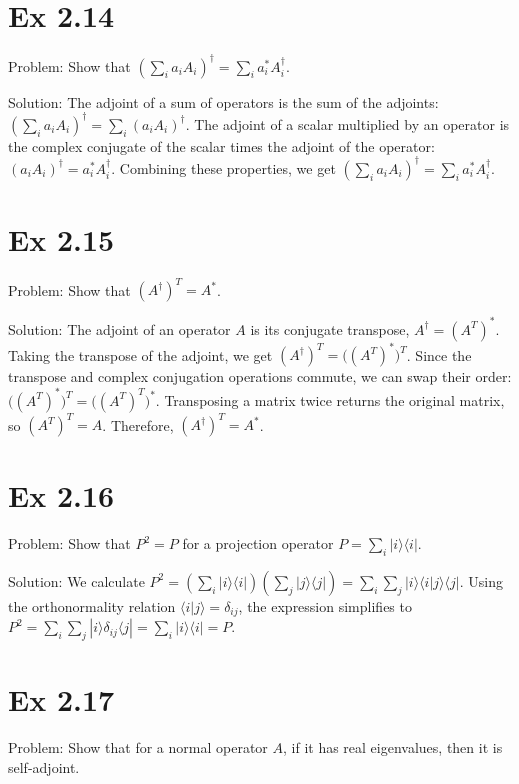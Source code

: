 \documentclass{article}
\newcommand{\0}{{$|0\rangle$}}
\newcommand{\1}{{$|1\rangle$}}
\begin{document}
\newpage
\section*{Ex 2.14  }
Problem: Show that $ \left(\sum_i a_i A_i\right)^\dagger = \sum_i a_i^* A_i^\dagger $.  

Solution: The adjoint of a sum of operators is the sum of the adjoints:  
$ \left(\sum_i a_i A_i\right)^\dagger = \sum_i (a_i A_i)^\dagger $.  
The adjoint of a scalar multiplied by an operator is the complex conjugate of the scalar times the adjoint of the operator:  
$ (a_i A_i)^\dagger = a_i^* A_i^\dagger $. Combining these properties, we get  
$ \left(\sum_i a_i A_i\right)^\dagger = \sum_i a_i^* A_i^\dagger $.

\newpage
\section*{Ex 2.15  }
Problem: Show that $ (A^\dagger)^T = A^* $.  

Solution: The adjoint of an operator $A$ is its conjugate transpose, $ A^\dagger = (A^T)^* $. Taking the transpose of the adjoint, we get  
$ (A^\dagger)^T = \big((A^T)^*\big)^T $. Since the transpose and complex conjugation operations commute, we can swap their order:  
$ \big((A^T)^*\big)^T = \big((A^T)^T\big)^* $. Transposing a matrix twice returns the original matrix, so $ (A^T)^T = A $. Therefore,  
$ (A^\dagger)^T = A^* $.

\newpage
\section*{Ex 2.16  }
Problem: Show that $ P^2=P $ for a projection operator $ P = \sum_i |i \rangle \langle i| $.  

Solution: We calculate  
$ P^2 = \left(\sum_i |i \rangle \langle i|\right)\left(\sum_j |j \rangle \langle j|\right) = \sum_i \sum_j |i \rangle \langle i|j \rangle \langle j| $. Using the orthonormality relation $ \langle i|j \rangle = \delta_{ij} $, the expression simplifies to  
$ P^2 = \sum_i \sum_j |i \rangle \delta_{ij} \langle j| = \sum_i |i \rangle \langle i| = P $.

\newpage
\section*{Ex 2.17  }
Problem: Show that for a normal operator $A$, if it has real eigenvalues, then it is self-adjoint.  
\end{document}
